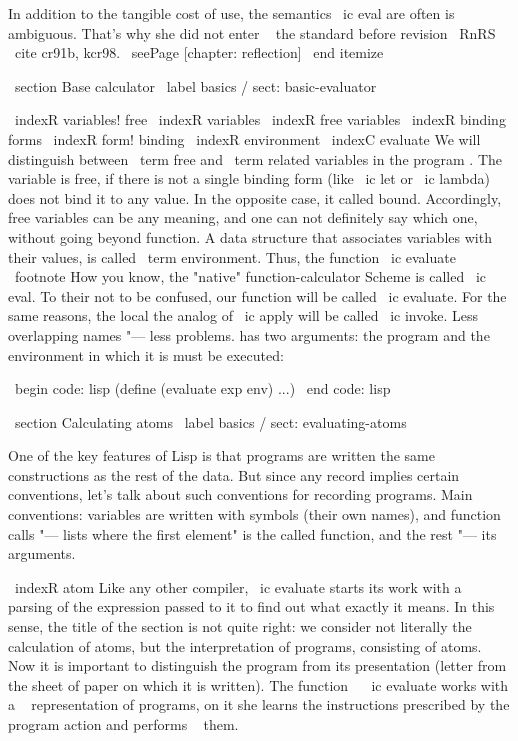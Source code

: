         In addition to the tangible cost of use, the semantics \ ic {eval} are often
        is ambiguous. That's why she did not enter ~ the standard before
        revision \ RnRS ~ \ cite {cr91b, kcr98}. \ seePage [chapter: reflection]
\ end {itemize}


\ section {Base calculator} \ label {basics / sect: basic-evaluator}

\ indexR {variables! free} \ indexR {variables}
\ indexR {free variables}
\ indexR {binding forms} \ indexR {form! binding}
\ indexR {environment}
\ indexC {evaluate}
We will distinguish between \ term {free} and \ term {related variables} in the program .
The variable is free, if there is not a single binding form (like \ ic {let} or
\ ic {lambda}) does not bind it to any value. In the opposite case, it
called bound. Accordingly, free variables can be any
meaning, and one can not definitely say which one, without going beyond
function. A data structure that associates variables with their values,
is called \ term {environment}. Thus, the function \ ic {evaluate} \ footnote {How
you know, the "native" function-calculator Scheme is called \ ic {eval}. To their
not to be confused, our function will be called \ ic {evaluate}. For the same reasons, the local
the analog of \ ic {apply} will be called \ ic {invoke}. Less overlapping names "---
less problems.} has two arguments: the program and the environment in which it is
must be executed:

\ begin {code: lisp}
(define (evaluate exp env) ...)
\ end {code: lisp}


\ section {Calculating atoms} \ label {basics / sect: evaluating-atoms}

One of the key features of Lisp is that programs are written
the same constructions as the rest of the data. But since any record
implies certain conventions, let's talk about such conventions for recording
programs. Main conventions: variables are written with symbols (their own
names), and function calls "--- lists where the first element" is the called
function, and the rest "--- its arguments.

\ indexR {atom}
Like any other compiler, \ ic {evaluate} starts its work
with a ~ parsing of the expression passed to it to find out what exactly
it means. In this sense, the title of the section is not quite right: we
consider not literally the calculation of atoms, but the interpretation of programs,
consisting of atoms. Now it is important to distinguish the program from its presentation
(letter from the sheet of paper on which it is written). The function ~ \ ic {evaluate}
works with a ~ representation of programs, on it she learns the instructions prescribed by the program
action and performs ~ them.

